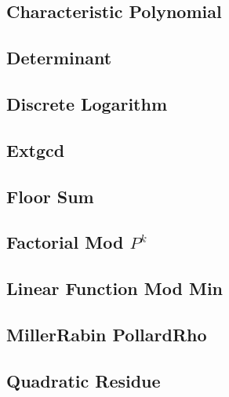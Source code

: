 \subsection{Characteristic Polynomial}

\subsection{Determinant}

\subsection{Discrete Logarithm}

\subsection{Extgcd}

%
\subsection{Floor Sum}

\subsection{Factorial Mod $P^k$}

\subsection{Linear Function Mod Min}

%
\subsection{MillerRabin PollardRho}

%
\subsection{Quadratic Residue}

